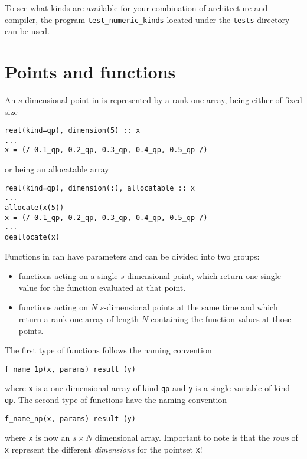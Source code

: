 To see what kinds are available for your combination of architecture and
compiler, the program \texttt{test\_numeric\_kinds} located under the
\texttt{tests} directory can be used.

\section{Points and functions} \label{sec:points_functions}

An $s$-dimensional point in \qmcpack{} is represented by a rank one
array, being either of fixed size 
%
\begin{lstlisting}
real(kind=qp), dimension(5) :: x
...
x = (/ 0.1_qp, 0.2_qp, 0.3_qp, 0.4_qp, 0.5_qp /)
\end{lstlisting}
%
or being an allocatable array
%
\begin{lstlisting}
real(kind=qp), dimension(:), allocatable :: x
...
allocate(x(5))
x = (/ 0.1_qp, 0.2_qp, 0.3_qp, 0.4_qp, 0.5_qp /)
...
deallocate(x)
\end{lstlisting}
%
Functions in \qmcpack{} can have parameters and can be divided into two groups:
\begin{itemize}
\item functions acting on a single $s$-dimensional point, which return one single value for the function evaluated at that point.
\item functions acting on $N$ $s$-dimensional points at the same time and which
return a rank one array of length $N$ containing the function values at those
points.
\end{itemize}
%
The first type of functions follows the naming convention
\begin{lstlisting}
f_name_1p(x, params) result (y)
\end{lstlisting}
where \verb!x! is a one-dimensional array of kind \verb!qp! and \verb!y! is a
single variable of kind \verb!qp!.  The second type of functions have the
naming convention
\begin{lstlisting}
f_name_np(x, params) result (y)
\end{lstlisting}
where \verb!x! is now an $s \times N$ dimensional array.  Important to note
is that the \emph{rows} of \verb!x! represent the different \emph{dimensions}
for the pointset \verb!x!!

